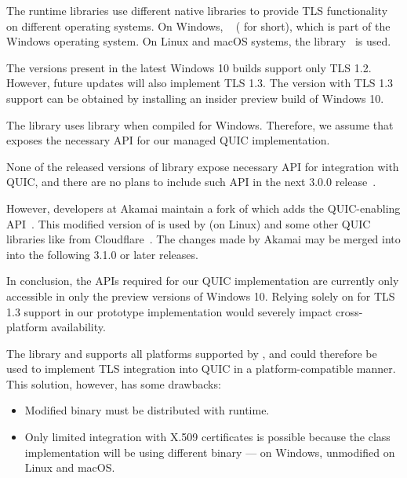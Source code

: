The \dotnet{} runtime libraries use different native libraries to provide TLS functionality on
different operating systems. On Windows, ~\cite{Schannel} (\libschannel{}
for short), which is part of the Windows operating system. On Linux and macOS systems, the
\libopenssl{} library~\cite{OpenSSLWeb} is used.

\begin{description}

     The \libschannel{} versions present in the latest Windows 10
builds support only TLS 1.2. However, future updates will also implement TLS 1.3. The \libschannel{}
version with TLS 1.3 support can be obtained by installing an insider preview build of Windows 10.

    The \libmsquic{} library uses \libschannel{} library when compiled for Windows. Therefore, we
assume that \libschannel{} exposes the necessary API for our managed QUIC implementation.

    \ditem{\libopenssl{}} None of the released versions of \libopenssl{} library expose necessary
API for integration with QUIC, and there are no plans to include such API in the next \libopenssl{}
3.0.0 release~\cite{OpensslBlogNoQuic}.

    However, developers at Akamai maintain a fork of \libopenssl{} which adds the QUIC-enabling
API~\cite{AkamaiOpensslGithub}. This modified version of \libopenssl{} is used by \libmsquic{} (on
Linux) and some other QUIC libraries like  from Cloudflare~\cite{quicheGithub}. The
changes made by Akamai may be merged into \libopenssl{} into the following 3.1.0 or later releases.

\end{description}

In conclusion, the APIs required for our QUIC implementation are currently only accessible in only
the preview versions of Windows 10. Relying solely on \libschannel{} for TLS 1.3 support in our
prototype implementation would severely impact cross-platform availability.

The \libopenssl{} library and supports all platforms supported by \dotnet{}, and could therefore be
used to implement TLS integration into QUIC in a platform-compatible manner. This solution, however,
has some drawbacks:

\begin{itemize}

  \item Modified \libopenssl{} binary must be distributed with \dotnet{} runtime.

  \item Only limited integration with X.509 certificates is possible because the
 class implementation will be using different binary --- 
on Windows, unmodified \libopenssl{} on Linux and macOS.

\end{itemize}

